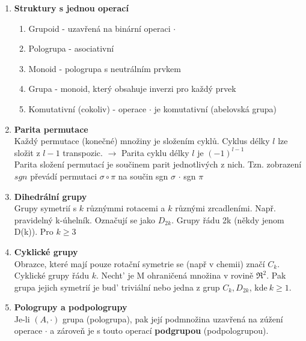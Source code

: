 \documentclass[12pt,a4paper]{article}
\begin{document}
	\begin{enumerate}
		\item \textbf{Struktury s jednou operací}\\
		\begin{enumerate}
			\item Grupoid - uzavřená na binární operaci $\cdot$
			\item Pologrupa - asociativní 
			\item Monoid - pologrupa s neutrálním prvkem
			\item Grupa - monoid, který obsahuje inverzi pro každý prvek
			\item Komutativní (cokoliv) - operace $\cdot $ je komutativní (abelovská grupa)
		\end{enumerate}
		
		\item \textbf{Parita permutace}\\
		Každý permutace (konečné) množiny je složením cyklů. Cyklus délky $l$ lze složit z $l-1$ transpozic. $\rightarrow$ Parita cyklu délky $l$ je $(-1)^{l-1}$\\
		Parita složení permutací je součinem parit jednotlivých z nich. Tzn. zobrazení $sgn$ převádí permutaci $\sigma \circ \pi$ na součin  sgn $\sigma$ $ \cdot$ sgn $\pi$	
		
		\item \textbf{Dihedrální grupy}\\
		Grupy symetrií s $k$ různýmmi rotacemi a $k$ různými zrcadleními. Např. pravidelný k-úhelník. Označují se jako $D_{2k}$. Grupy řádu 2k (někdy jenom D(k)). Pro $k  \geq 3$
		
		\item \textbf{Cyklické grupy}\\
		Obrazce, které mají pouze rotační symetrie se (např v chemii) značí $C_k$. Cyklické grupy řádu $k$.
		Necht’ je M ohraničená množina v rovině $\Re^2$. Pak grupa jejich symetrií je bud’ triviální nebo jedna z grup $C_k , D_{2k} $, kde$~k \geq 1$.
		\item \textbf{Pologrupy a podpologrupy}\\
		Je-li $(A,\cdot)$ grupa (pologrupa), pak její podmnožina uzavřená na zúžení operace $\cdot$ a zároveň je s touto operací \textbf{podgrupou} (podpologrupou).
		

\end{enumerate}
\end{document}
